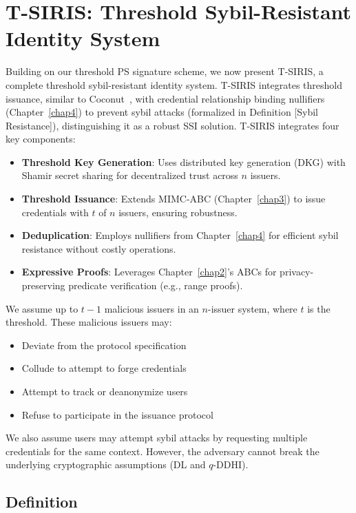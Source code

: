 \section{T-SIRIS: Threshold Sybil-Resistant Identity System}
\label{sec:tsiris}
Building on our threshold PS signature scheme, we now present T-SIRIS, a complete threshold sybil-resistant identity system. T-SIRIS integrates threshold issuance, similar to Coconut~\cite{sonnino_coconut_2020}, with credential relationship binding nullifiers (Chapter~\ref{chap4}) to prevent sybil attacks (formalized in Definition [Sybil Resistance]), distinguishing it as a robust SSI solution. T-SIRIS integrates four key components:
\begin{itemize}
    \item \textbf{Threshold Key Generation}: Uses distributed key generation (DKG) with Shamir secret sharing for decentralized trust across $n$ issuers.
    \item \textbf{Threshold Issuance}: Extends MIMC-ABC (Chapter~\ref{chap3}) to issue credentials with $t$ of $n$ issuers, ensuring robustness.
    \item \textbf{Deduplication}: Employs nullifiers from Chapter~\ref{chap4} for efficient sybil resistance without costly operations.
    \item \textbf{Expressive Proofs}: Leverages Chapter~\ref{chap2}'s ABCs for privacy-preserving predicate verification (e.g., range proofs).
\end{itemize}


We assume up to $t-1$ malicious issuers in an $n$-issuer system, where $t$ is the threshold. These malicious issuers may:
\begin{itemize}
    \item Deviate from the protocol specification
    \item Collude to attempt to forge credentials
    \item Attempt to track or deanonymize users
    \item Refuse to participate in the issuance protocol
\end{itemize}

We also assume users may attempt sybil attacks by requesting multiple credentials for the same context. However, the adversary cannot break the underlying cryptographic assumptions (DL and $q$-DDHI).



\subsection{Definition}

